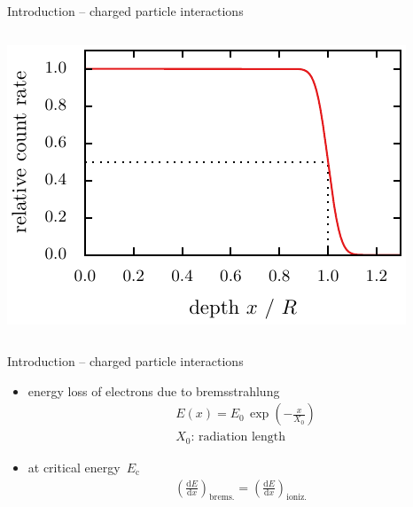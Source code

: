 \documentclass[11pt,xcolor=dvipsnames,professionalfonts]{beamer}
\begin{document}
\begin{frame}{Introduction -- charged particle interactions}
\begin{columns}
\begin{center}
				\includegraphics[width=1.0\textwidth]{./figures/range.pdf}
			\end{center}
	\end{columns}
\end{frame}


\begin{frame}{Introduction -- charged particle interactions}
	\begin{itemize}
		\setlength\itemsep{2.em}
		\item energy loss of electrons due to bremsstrahlung
		\begin{align*}
			&E(x) = E_0 \, \exp\left(- \frac{x}{X_0} \right) \\[.5em]
			&X_0\text{: radiation length}
		\end{align*}
		
		\item at critical energy~$E_\mathrm{c}$
		\begin{align*}
			\left( \frac{\mathrm{d}E}{\mathrm{d}x}\right)_\mathrm{brems.} = \left( \frac{\mathrm{d}E}{\mathrm{d}x} \right)_\mathrm{ioniz.}
		\end{align*}
	\end{itemize}
\end{frame}
\end{document}

